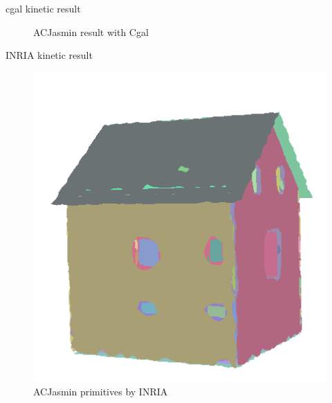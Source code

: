 \documentclass[10pt]{beamer}
\begin{document}
\begin{frame}{cgal kinetic result }
\begin{figure}[H]
\begin{minipage}[t]{0.35\textwidth}
            \caption*{ACJasmin result with Cgal}
          \end{minipage}
      \end{figure}  
\end{frame}
\begin{frame}{INRIA kinetic result }
    \begin{figure}[H]
        \centering
        \begin{minipage}[t]{0.29\textwidth}
          \includegraphics[width=\textwidth]{../../images/screen_kinetic/ACJasmin_primitive.png}
          \caption*{ACJasmin primitives by INRIA}
        \end{minipage}
        \begin{minipage}[t]{0.35\textwidth}

\end{minipage}
\end{figure}
\end{frame}
\end{document}
